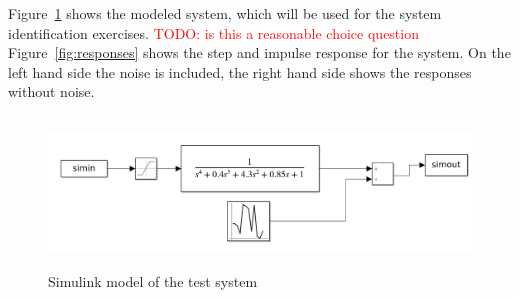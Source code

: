 \documentclass{scrartcl}
\begin{document}
Figure~\ref{fig:testmodel} shows the modeled system, which will be used for the system identification exercises.
\textcolor{red}{TODO: is this a reasonable choice question}
Figure~\ref{fig:responses} shows the step and impulse response for the system. On the left hand side the noise is included, the right hand side shows the responses without noise.

\begin{figure}[h]
	\centering
	\includegraphics[height=4cm]{figures/systemmodel.png}
	\caption{Simulink model of the test system}\label{fig:testmodel}
\end{figure}
\end{document}
